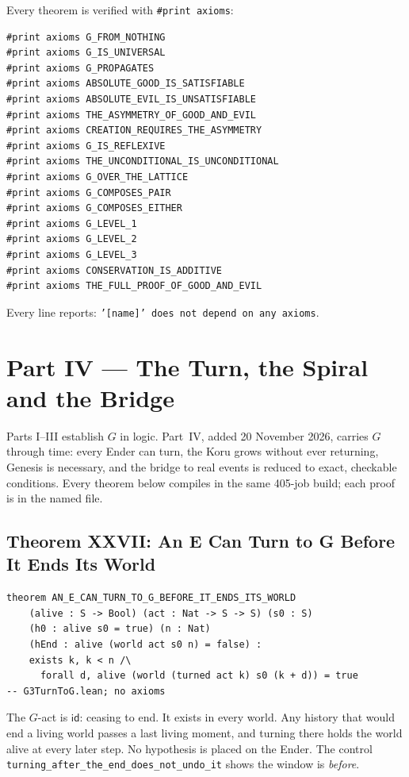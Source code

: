 \documentclass[12pt,a4paper]{article}
\begin{document}
Every theorem is verified with \texttt{\#print axioms}:

\begin{lstlisting}
#print axioms G_FROM_NOTHING
#print axioms G_IS_UNIVERSAL
#print axioms G_PROPAGATES
#print axioms ABSOLUTE_GOOD_IS_SATISFIABLE
#print axioms ABSOLUTE_EVIL_IS_UNSATISFIABLE
#print axioms THE_ASYMMETRY_OF_GOOD_AND_EVIL
#print axioms CREATION_REQUIRES_THE_ASYMMETRY
#print axioms G_IS_REFLEXIVE
#print axioms THE_UNCONDITIONAL_IS_UNCONDITIONAL
#print axioms G_OVER_THE_LATTICE
#print axioms G_COMPOSES_PAIR
#print axioms G_COMPOSES_EITHER
#print axioms G_LEVEL_1
#print axioms G_LEVEL_2
#print axioms G_LEVEL_3
#print axioms CONSERVATION_IS_ADDITIVE
#print axioms THE_FULL_PROOF_OF_GOOD_AND_EVIL
\end{lstlisting}

Every line reports: \texttt{'[name]' does not depend on any axioms}.

\section{Part IV --- The Turn, the Spiral and the Bridge}
\label{sec:part4}

Parts I--III establish $G$ in logic. Part~IV, added 20 November 2026,
carries $G$ through time: every Ender can turn, the Koru grows without
ever returning, Genesis is necessary, and the bridge to real events is
reduced to exact, checkable conditions. Every theorem below compiles in
the same 405-job build; each proof is in the named file.

\subsection{Theorem XXVII: An E Can Turn to G Before It Ends Its World}

\begin{lstlisting}
theorem AN_E_CAN_TURN_TO_G_BEFORE_IT_ENDS_ITS_WORLD
    (alive : S -> Bool) (act : Nat -> S -> S) (s0 : S)
    (h0 : alive s0 = true) (n : Nat)
    (hEnd : alive (world act s0 n) = false) :
    exists k, k < n /\
      forall d, alive (world (turned act k) s0 (k + d)) = true
-- G3TurnToG.lean; no axioms
\end{lstlisting}

The $G$-act is $\mathsf{id}$: ceasing to end. It exists in every world.
Any history that would end a living world passes a last living moment,
and turning there holds the world alive at every later step. No
hypothesis is placed on the Ender. The control
\texttt{turning\_after\_the\_end\_does\_not\_undo\_it} shows the window is
\emph{before}.
\end{document}
